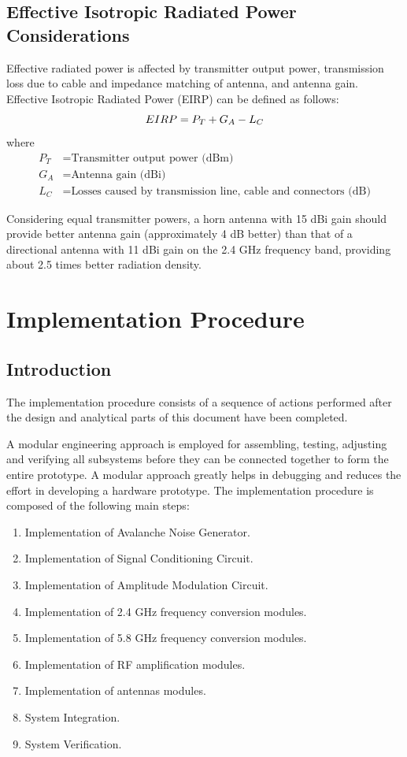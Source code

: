 \documentclass[12pt,a4paper]{report}
\begin{document}
	\subsection{Effective Isotropic Radiated Power Considerations}
	Effective radiated power is affected by transmitter output power, transmission loss due to cable and impedance matching of antenna, and antenna gain. Effective Isotropic Radiated Power (EIRP) can be defined as follows:
	\begingroup
	\setlength{\mathindent}{0pt}
	\begin{equation*}
		\hfill
		EIRP = P_T + G_A - L_C
		\hfill
	\end{equation*}
	\endgroup
	where
	\begin{align*}
		P_T &= \text{Transmitter output power (dBm)} \\
		G_A &= \text{Antenna gain (dBi)} \\
		L_C &= \text{Losses caused by transmission line, cable and connectors (dB)}
	\end{align*}
	
	Considering equal transmitter powers, a horn antenna with 15 dBi gain should provide better antenna gain (approximately 4 dB better) than that of a directional antenna with 11 dBi gain on the 2.4 GHz frequency band, providing about 2.5 times better radiation density.
	\section{Implementation Procedure}
	
	\subsection{Introduction}
	The implementation procedure consists of a sequence of actions performed after the design and analytical parts of this document have been completed.
	
	A modular engineering approach is employed for assembling, testing, adjusting and verifying all subsystems before they can be connected together to form the entire prototype. A modular approach greatly helps in debugging and reduces the effort in developing a hardware prototype. The implementation procedure is composed of the following main steps:
	\begin{enumerate}
		\item Implementation of Avalanche Noise Generator.
		\item Implementation of Signal Conditioning Circuit.
		\item Implementation of Amplitude Modulation Circuit.
		\item Implementation of 2.4 GHz frequency conversion modules.
		\item Implementation of 5.8 GHz frequency conversion modules.
		\item Implementation of RF amplification modules.
		\item Implementation of antennas modules.
		\item System Integration.
		\item System Verification.
	\end{enumerate}
	
\end{document}
